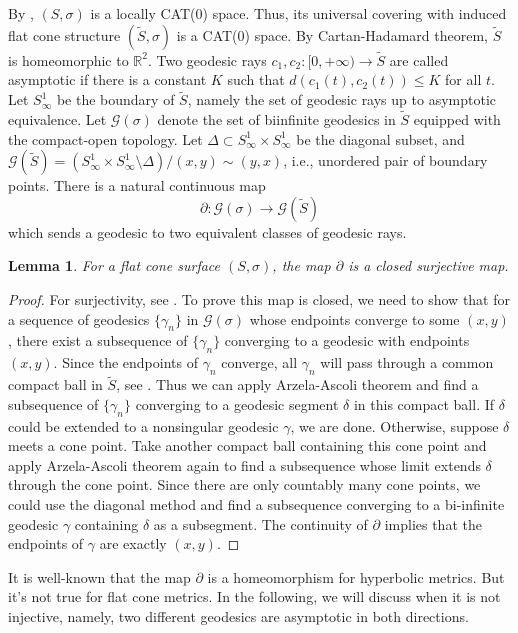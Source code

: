 \documentclass[reqno]{amsart}
\theoremstyle{plain}
\newtheorem{lemma}[thm]{Lemma}
\theoremstyle{definition}
\theoremstyle{remark}
\theoremstyle{definition}
\newcommand{\R}{\mathbb R}
\newcommand{\?}{\textcolor{red}{?}}
\newcommand{\Gsigma}{\mathcal{G}(\sigma) }
\newcommand{\Gs}{\mathcal{G}(\tilde{S}) }
\begin{document}
By \cite[Theorem II.5.5]{bridson2013metric}, $(S,\sigma)$ is a locally CAT(0) space. Thus, its universal covering with induced flat cone structure $(\tilde{S},\sigma)$ is a CAT(0) space. By Cartan-Hadamard theorem, $\tilde{S}$ is homeomorphic to $\R^2$. Two geodesic rays $c_1,c_2:[0,+\infty)\rightarrow \tilde{S}$ are called asymptotic if there is a constant $K$ such that $d(c_1(t),c_2(t))\le K$ for all $t$. Let $S^1_\infty$ be the boundary of $\tilde{S}$, namely the set of geodesic rays up to asymptotic equivalence. Let $\Gsigma$ denote the set of biinfinite geodesics in $\tilde{S}$ equipped with the compact-open topology. Let $\Delta \subset S^1_\infty\times S^1_\infty$ be the diagonal subset, and $\mathcal{G}(\tilde{S}) = (S^1_\infty \times S^1_\infty \setminus \Delta) / (x,y)\sim(y,x)$, i.e., unordered pair of boundary points. There is a natural continuous map 
\[\partial:\Gsigma\to \Gs  \]
which sends a geodesic to two equivalent classes of geodesic rays.

\begin{lemma}\label{closed}
For a flat cone surface $(S,\sigma)$, the map $\partial$ is a closed surjective map.
\end{lemma}
\begin{proof}
For surjectivity, see \cite[Theorem II.9.33]{bridson2013metric}. To prove this map is closed, we need to show that for a sequence of geodesics $\{\gamma_n\}$ in $\Gsigma$ whose endpoints converge to some $(x,y)$, there exist a subsequence of $\{\gamma_n\}$ converging to a geodesic with endpoints $(x,y)$. 
Since the endpoints of $\gamma_n$ converge, all $\gamma_n$ will pass through a common compact ball in $\tilde{S}$, see \cite[]{ballmann1985manifolds}. Thus we can apply Arzela-Ascoli theorem and find a subsequence of $\{\gamma_n\}$ converging to a geodesic segment $\delta$ in this compact ball. If $\delta$ could be extended to a nonsingular geodesic $\gamma$, we are done. Otherwise, suppose $\delta$ meets a cone point. Take another compact ball containing this cone point and apply Arzela-Ascoli theorem again to find a subsequence whose limit extends $\delta$ through the cone point. Since there are only countably many cone points, we could use the diagonal method and find a subsequence converging to a bi-infinite geodesic $\gamma$ containing $\delta$ as a subsegment. The continuity of $\partial$ implies that the endpoints of $\gamma$ are exactly $(x,y)$.
\end{proof}

It is well-known that the map $\partial$ is a homeomorphism for hyperbolic metrics. But it's not true for flat cone metrics. In the following, we will discuss when it is not injective, namely, two different geodesics are asymptotic in both directions.
\end{document}

